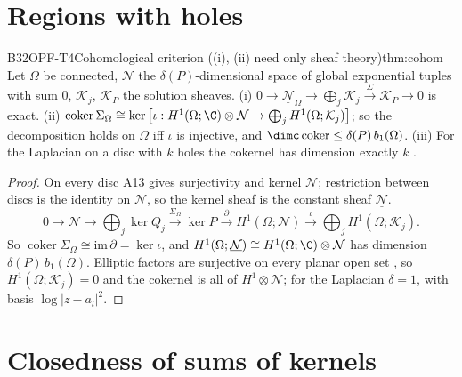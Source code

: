 \section{Regions with holes}

\begin{dimcard}{B32}{OPF-T4}{Cohomological criterion}{\pw{} ((i), (ii) need only sheaf theory)}{thm:cohom}
Let $\Omega$ be connected, $\mathcal N$ the $\delta(P)$-dimensional space of global exponential tuples with sum $0$, $\mathcal K_j$, $\mathcal K_P$ the solution sheaves. (i) $0\to\underline{\mathcal N}_\Omega\to\bigoplus_j\mathcal K_j\xrightarrow{\Sigma}\mathcal K_P\to0$ is exact. (ii) $\operatorname{coker}\Sigma_\Omega\cong\ker\big[\iota:H^1(\Omega;\C)\otimes\mathcal N\to\bigoplus_jH^1(\Omega;\mathcal K_j)\big]$; so the decomposition holds on $\Omega$ iff $\iota$ is injective, and $\dimc\operatorname{coker}\le\delta(P)\,b_1(\Omega)$. (iii) For the Laplacian on a disc with $k$ holes the cokernel has dimension exactly $k$ \cf.
\end{dimcard}
\begin{proof}
On every disc A13 gives surjectivity and kernel $\mathcal N$; restriction between discs is the identity on $\mathcal N$, so the kernel sheaf is the constant sheaf $\underline{\mathcal N}$.
\[
0\to\mathcal N\to\bigoplus_j\ker Q_j\xrightarrow{\Sigma_\Omega}\ker P\xrightarrow{\ \partial\ }H^1(\Omega;\underline{\mathcal N})\xrightarrow{\ \iota\ }\bigoplus_jH^1(\Omega;\mathcal K_j).
\]
So $\operatorname{coker}\Sigma_\Omega\cong\mathrm{im}\,\partial=\ker\iota$, and $H^1(\Omega;\underline{\mathcal N})\cong H^1(\Omega;\C)\otimes\mathcal N$ has dimension $\delta(P)\,b_1(\Omega)$.
Elliptic factors are surjective on every planar open set \cf, so $H^1(\Omega;\mathcal K_j)=0$ and the cokernel is all of $H^1\otimes\mathcal N$; for the Laplacian $\delta=1$, with basis $\log|z-a_l|^2$.
\end{proof}

\section{Closedness of sums of kernels}

